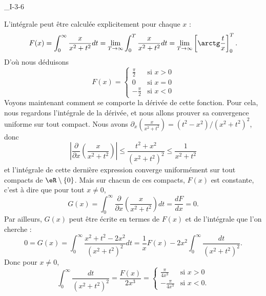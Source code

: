 

\begin{corrige}{_I-3-6}

L'intégrale peut être calculée explicitement pour chaque $x$ :
\begin{equation}
	F(x)=\int_0^{\infty}\frac{ x }{ x^2+t^2 }dt=\lim_{T\to\infty}\int_0^{T}\frac{ x }{ x^2+t^2 }dt=\lim_{T\to\infty}\left[ \arctg\frac{ t }{ x } \right]_0^T.
\end{equation}
D'où nous déduisons
\begin{equation}
	F(x)=\begin{cases}
	\frac{ \pi }{ 2 }	&	\text{si }x>0\\
	0			&	\text{si }x=0\\
	-\frac{ \pi }{2}	&	\text{si }x<0
\end{cases}
\end{equation}
Voyons maintenant comment se comporte la dérivée de cette fonction. Pour cela, nous regardons l'intégrale de la dérivée, et nous allons prouver sa convergence uniforme sur tout compact. Nous avons $\partial_x\left(\frac{ x }{ x^2+t^2 }\right)=(t^2-x^2)/(x^2+t^2)^2$, donc
\begin{equation}
	\left| \frac{ \partial  }{ \partial x }\left(\frac{ x }{ x^2+t^2 }\right) \right| \leq \frac{ t^2+x^2 }{ (x^2+t^2)^2 }\leq \frac{1}{ x^2+t^2 }
\end{equation}
et l'intégrale de cette dernière expression converge uniformément sur tout compacts de $\eR\setminus\{ 0 \}$. Mais sur chacun de ces compacts, $F(x)$ est constante, c'est à dire que pour tout $x\neq 0$,
\begin{equation}
	G(x)=\int_0^{\infty}\frac{ \partial  }{ \partial x }\left( \frac{ x }{ x^2+t^2 } \right)dt=\frac{ dF }{ dx }=0.
\end{equation}
Par ailleurs, $G(x)$ peut être écrite en termes de $F(x)$ et de l'intégrale que l'on cherche :
\begin{equation}
	0=G(x)=\int_0^{\infty}\frac{ x^2+t^2-2x^2 }{ (x^2+t^2)^2 }dt=\frac{1}{ x }F(x)-2x^2\int_0^{\infty}\frac{ dt }{ (x^2+t^2)^2 }.
\end{equation}
Donc pour $x\neq 0$,
\begin{equation}
	\int_0^{\infty}\frac{ dt }{ (x^2+t^2)^2 }=\frac{ F(x) }{ 2x^3 }=\begin{cases}
	\frac{ \pi }{ 4x^3 }	&	\text{si }x>0\\
	-\frac{ \pi }{ 4x^3 }	&	 \text{si }x<0.
\end{cases}
\end{equation}

\end{corrige}
